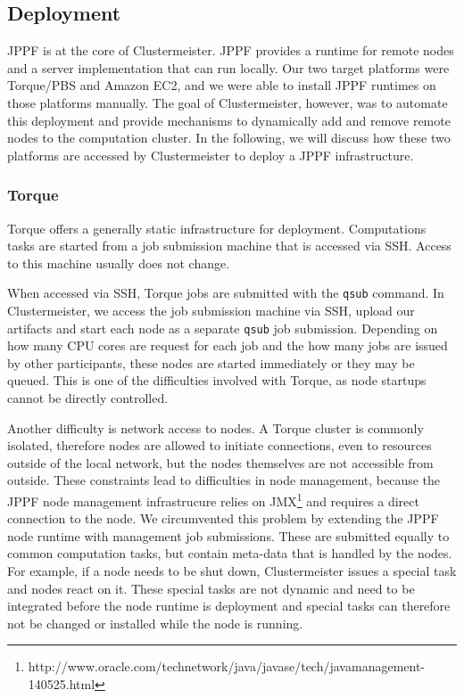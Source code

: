 \documentclass{article}
\begin{document}
\subsection{Deployment}

JPPF is at the core of Clustermeister. JPPF provides a runtime for remote nodes and a server implementation that can run locally. Our two target platforms were Torque/PBS and Amazon EC2, and we were able to install JPPF runtimes on those platforms manually. The goal of Clustermeister, however, was to automate this deployment and provide mechanisms to dynamically add and remove remote nodes to the computation cluster. In the following, we will discuss how these two platforms are accessed by Clustermeister to deploy a JPPF infrastructure.

\subsubsection{Torque}

Torque offers a generally static infrastructure for deployment. Computations tasks are started from a job submission machine that is accessed via SSH. Access to this machine usually does not change.

When accessed via SSH, Torque jobs are submitted with the \texttt{qsub} command. In Clustermeister, we access the job submission machine via SSH, upload our artifacts and start each node as a separate \texttt{qsub} job submission. Depending on how many CPU cores are request for each job and the how many jobs are issued by other participants, these nodes are started immediately or they may be queued. This is one of the difficulties involved with Torque, as node startups cannot be directly controlled.

Another difficulty is network access to nodes. A Torque cluster is commonly isolated, therefore nodes are allowed to initiate connections, even to resources outside of the local network, but the nodes themselves are not accessible from outside. These constraints lead to difficulties in node management, because the JPPF node management infrastrucure relies on JMX\footnote{http://www.oracle.com/technetwork/java/javase/tech/javamanagement-140525.html} and requires a direct connection to the node. We circumvented this problem by extending the JPPF node runtime with management job submissions. These are submitted equally to common computation tasks, but contain meta-data that is handled by the nodes. For example, if a node needs to be shut down, Clustermeister issues a special task and nodes react on it. These special tasks are not dynamic and need to be integrated before the node runtime is deployment and special tasks can therefore not be changed or installed while the node is running.
\end{document}

